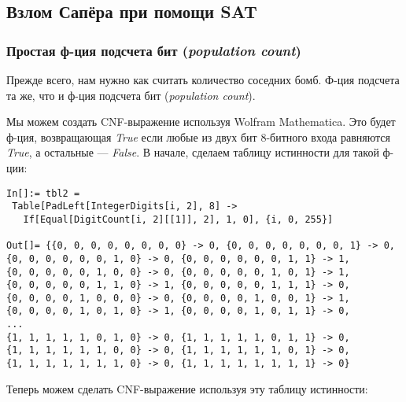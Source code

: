 \subsection{Взлом Сапёра при помощи SAT}
\label{minesweeper_SAT}

\renewcommand{\CURPATH}{equations/minesweeper_SAT}

\subsubsection{Простая ф-ция подсчета бит (\textit{population count})}

Прежде всего, нам нужно как считать количество соседних бомб.
Ф-ция подсчета та же, что и ф-ция подсчета бит (\textit{population count}).

Мы можем создать \ac{CNF}-выражение используя Wolfram Mathematica.
Это будет ф-ция, возвращающая \textit{True} если любые из двух бит 8-битного входа равняются \textit{True},
а остальные --- \textit{False}.
В начале, сделаем таблицу истинности для такой ф-ции:

\begin{lstlisting}
In[]:= tbl2 = 
 Table[PadLeft[IntegerDigits[i, 2], 8] -> 
   If[Equal[DigitCount[i, 2][[1]], 2], 1, 0], {i, 0, 255}]

Out[]= {{0, 0, 0, 0, 0, 0, 0, 0} -> 0, {0, 0, 0, 0, 0, 0, 0, 1} -> 0, 
{0, 0, 0, 0, 0, 0, 1, 0} -> 0, {0, 0, 0, 0, 0, 0, 1, 1} -> 1, 
{0, 0, 0, 0, 0, 1, 0, 0} -> 0, {0, 0, 0, 0, 0, 1, 0, 1} -> 1, 
{0, 0, 0, 0, 0, 1, 1, 0} -> 1, {0, 0, 0, 0, 0, 1, 1, 1} -> 0, 
{0, 0, 0, 0, 1, 0, 0, 0} -> 0, {0, 0, 0, 0, 1, 0, 0, 1} -> 1, 
{0, 0, 0, 0, 1, 0, 1, 0} -> 1, {0, 0, 0, 0, 1, 0, 1, 1} -> 0, 
...
{1, 1, 1, 1, 1, 0, 1, 0} -> 0, {1, 1, 1, 1, 1, 0, 1, 1} -> 0, 
{1, 1, 1, 1, 1, 1, 0, 0} -> 0, {1, 1, 1, 1, 1, 1, 0, 1} -> 0, 
{1, 1, 1, 1, 1, 1, 1, 0} -> 0, {1, 1, 1, 1, 1, 1, 1, 1} -> 0}
\end{lstlisting}

Теперь можем сделать \ac{CNF}-выражение используя эту таблицу истинности:

